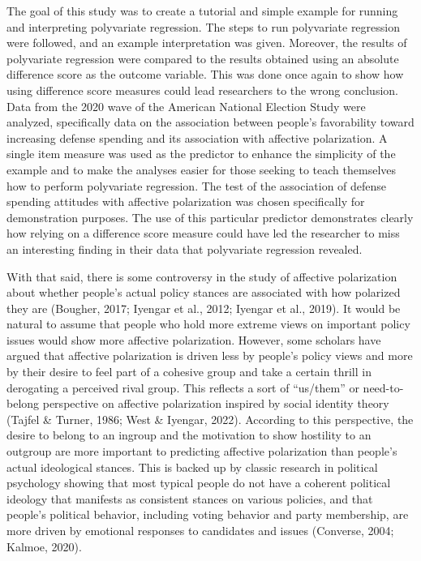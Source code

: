 \documentclass[authordate, meta, issue]{jote-new-article}
\begin{document}
	The goal of this study was to create a tutorial and simple example for running and interpreting polyvariate regression. The steps to run polyvariate regression were followed, and an example interpretation was given. Moreover, the results of polyvariate regression were compared to the results obtained using an absolute difference score as the outcome variable. This was done once again to show how using difference score measures could lead researchers to the wrong conclusion. Data from the 2020 wave of the American National Election Study were analyzed, specifically data on the association between people's favorability toward increasing defense spending and its association with affective polarization. A single item measure was used as the predictor to enhance the simplicity of the example and to make the analyses easier for those seeking to teach themselves how to perform polyvariate regression. The test of the association of defense spending attitudes with affective polarization was chosen specifically for demonstration purposes. The use of this particular predictor demonstrates clearly how relying on a difference score measure could have led the researcher to miss an interesting finding in their data that polyvariate regression revealed.



	With that said, there is some controversy in the study of affective polarization about whether people's actual policy stances are associated with how polarized they are (Bougher, 2017; Iyengar et al., 2012; Iyengar et al., 2019). It would be natural to assume that people who hold more extreme views on important policy issues would show more affective polarization. However, some scholars have argued that affective polarization is driven less by people's policy views and more by their desire to feel part of a cohesive group and take a certain thrill in derogating a perceived rival group. This reflects a sort of “us/them” or need-to-belong perspective on affective polarization inspired by social identity theory (Tajfel \& Turner, 1986; West \& Iyengar, 2022). According to this perspective, the desire to belong to an ingroup and the motivation to show hostility to an outgroup are more important to predicting affective polarization than people's actual ideological stances. This is backed up by classic research in political psychology showing that most typical people do not have a coherent political ideology that manifests as consistent stances on various policies, and that people's political behavior, including voting behavior and party membership, are more driven by emotional responses to candidates and issues (Converse, 2004; Kalmoe, 2020).
\end{document}
